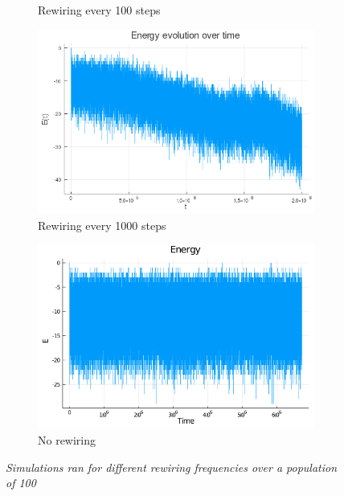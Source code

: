 \documentclass[12pt,openright,twoside]{book}
\begin{document}
\begin{appendices}
\begin{figure}[!htb]
\begin{subfigure}{0.47\linewidth}
    \caption{Rewiring every 100 steps}
\end{subfigure}
\begin{subfigure}{0.47\linewidth}
    \includegraphics[width=\linewidth]{figures/2_2_1000rew/energy_evolution.png}
    \caption{Rewiring every 1000 steps}
\end{subfigure}
\begin{subfigure}{0.47\linewidth}
    \includegraphics[width=\linewidth]{figures/no_rew/Energy_norewire2.png}
    \caption{No rewiring}
\end{subfigure}
\caption{\textit{{\small Simulations ran for different rewiring frequencies over a population of 100}}}
\label{2_2_rew}
\end{figure}


\end{appendices}
\end{document}
